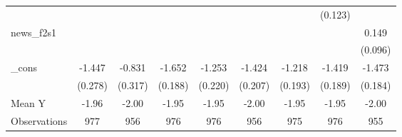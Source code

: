 {\begin{tabular}{l*{8}{c}}
            &                     &                     &                     &                     &                     &                     &     (0.123)         &                     \\
\addlinespace
news\_f2s1   &                     &                     &                     &                     &                     &                     &                     &       0.149         \\
            &                     &                     &                     &                     &                     &                     &                     &     (0.096)         \\
\addlinespace
\_cons      &      -1.447\sym{***}&      -0.831\sym{**} &      -1.652\sym{***}&      -1.253\sym{***}&      -1.424\sym{***}&      -1.218\sym{***}&      -1.419\sym{***}&      -1.473\sym{***}\\
            &     (0.278)         &     (0.317)         &     (0.188)         &     (0.220)         &     (0.207)         &     (0.193)         &     (0.189)         &     (0.184)         \\
\midrule
Mean Y      &       -1.96         &       -2.00         &       -1.95         &       -1.95         &       -2.00         &       -1.95         &       -1.95         &       -2.00         \\
Observations&         977         &         956         &         976         &         976         &         956         &         975         &         976         &         955         \\
\bottomrule
\end{tabular}
}
